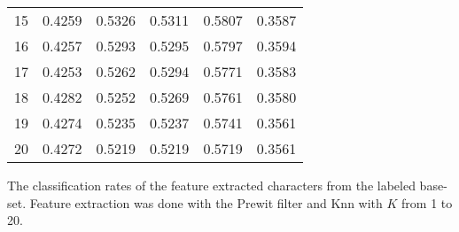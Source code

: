 \begin{minipage}{\linewidth}
\begin{tabular}{r|ccccc}
15         & 0.4259             & 0.5326             & 0.5311                   & 0.5807               & 0.3587          \\
16         & 0.4257             & 0.5293             & 0.5295                   & 0.5797               & 0.3594          \\
17         & 0.4253             & 0.5262             & 0.5294                   & 0.5771               & 0.3583          \\
18         & 0.4282             & 0.5252             & 0.5269                   & 0.5761               & 0.3580          \\
19         & 0.4274             & 0.5235             & 0.5237                   & 0.5741               & 0.3561          \\
20         & 0.4272             & 0.5219             & 0.5219                   & 0.5719               & 0.3561 
\end{tabular}\par
\bigskip
The classification rates of the feature extracted characters from the labeled base-set. Feature extraction was done with the Prewit filter and  Knn with $K$ from 1 to 20. 
\end{minipage}



